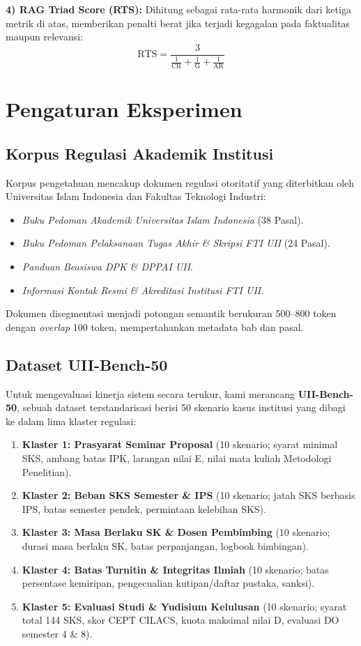\documentclass[conference]{IEEEtran}
\begin{document}
\textbf{4) RAG Triad Score (RTS):} Dihitung sebagai rata-rata harmonik dari ketiga metrik di atas, memberikan penalti berat jika terjadi kegagalan pada faktualitas maupun relevansi:
\begin{equation}
\text{RTS} = \frac{3}{\frac{1}{\text{CR}} + \frac{1}{\text{G}} + \frac{1}{\text{AR}}}
\end{equation}

\section{Pengaturan Eksperimen}

\subsection{Korpus Regulasi Akademik Institusi}
Korpus pengetahuan mencakup dokumen regulasi otoritatif yang diterbitkan oleh Universitas Islam Indonesia dan Fakultas Teknologi Industri:
\begin{itemize}
    \item \textit{Buku Pedoman Akademik Universitas Islam Indonesia} (38 Pasal).
    \item \textit{Buku Pedoman Pelaksanaan Tugas Akhir \& Skripsi FTI UII} (24 Pasal).
    \item \textit{Panduan Beasiswa DPK \& DPPAI UII}.
    \item \textit{Informasi Kontak Resmi \& Akreditasi Institusi FTI UII}.
\end{itemize}
Dokumen disegmentasi menjadi potongan semantik berukuran 500--800 token dengan \textit{overlap} 100 token, mempertahankan metadata bab dan pasal.

\subsection{Dataset UII-Bench-50}
Untuk mengevaluasi kinerja sistem secara terukur, kami merancang \textbf{UII-Bench-50}, sebuah dataset terstandarisasi berisi 50 skenario kasus institusi yang dibagi ke dalam lima klaster regulasi:
\begin{enumerate}
    \item \textbf{Klaster 1: Prasyarat Seminar Proposal} (10 skenario; syarat minimal SKS, ambang batas IPK, larangan nilai E, nilai mata kuliah Metodologi Penelitian).
    \item \textbf{Klaster 2: Beban SKS Semester \& IPS} (10 skenario; jatah SKS berbasis IPS, batas semester pendek, permintaan kelebihan SKS).
    \item \textbf{Klaster 3: Masa Berlaku SK \& Dosen Pembimbing} (10 skenario; durasi masa berlaku SK, batas perpanjangan, logbook bimbingan).
    \item \textbf{Klaster 4: Batas Turnitin \& Integritas Ilmiah} (10 skenario; batas persentase kemiripan, pengecualian kutipan/daftar pustaka, sanksi).
    \item \textbf{Klaster 5: Evaluasi Studi \& Yudisium Kelulusan} (10 skenario; syarat total 144 SKS, skor CEPT CILACS, kuota maksimal nilai D, evaluasi DO semester 4 \& 8).
\end{enumerate}
\end{document}
